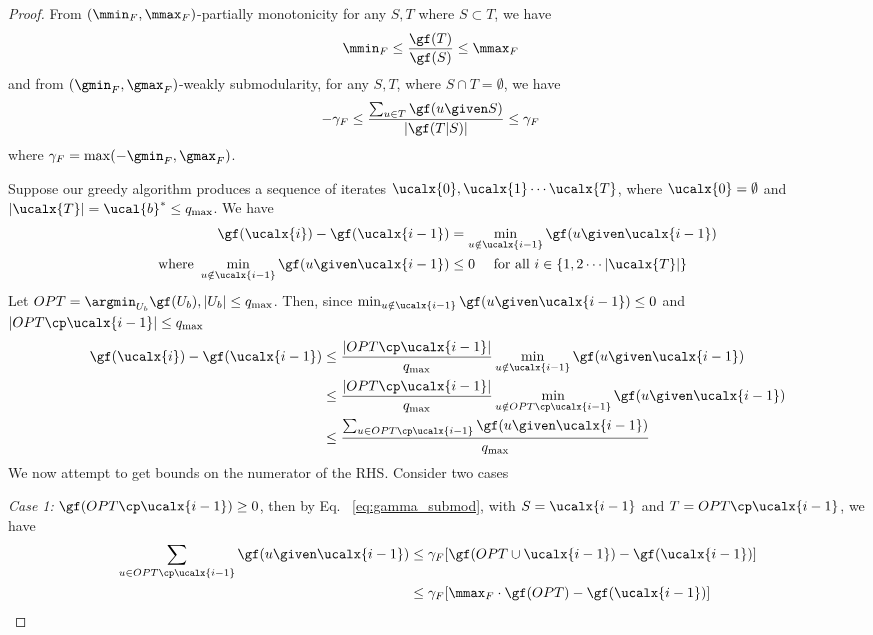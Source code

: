\begin{proof}
From $(\mmin_F,\mmax_F)$-partially monotonicity for any $S,T$ where $S \subset T$, we have
\begin{align}
    \mmin_F &\le \frac{\gf(T)}{\gf(S)} \le \mmax_F
\end{align}
and from $(\gmin_F,\gmax_F)$-weakly submodularity, for any $S,T$, where $S \cap T = \emptyset$, we have
\begin{align}
    -\gamma_F &\le \frac{\sum_{u \in T} \gf(u\given    S)}{|\gf(T|S)|} \le \gamma_F
\label{eq:gamma_submod}
\end{align}
where $\gamma_F = \max(-\gmin_F, \gmax_F)$.

Suppose our greedy algorithm produces a sequence of iterates $\ucalx{0}, \ucalx{1} \cdots \ucalx{T}$, where $\ucalx{0} = \emptyset$ and $|\ucalx{T}| = \ucal{b}^*\le q_{\max}$. We have
\begin{align}
    \gf(\ucalx{i}) - \gf(\ucalx{i-1}) &= \min_{u \notin \ucalx{i-1}} \gf(u\given     \ucalx{i-1})\\
    \text{where } \min_{u \notin \ucalx{i-1}} \gf(u\given     \ucalx{i-1}) &\le 0 ~\quad \text{for all } i \in \{1,2 \cdots |\ucalx{T}|\}
\end{align}
Let $OPT=\argmin_{U_b} \gf(U_b), |U_b| \le {q_{\max}}$. Then, since $\min_{u \notin \ucalx{i-1}} \gf(u\given     \ucalx{i-1}) \le 0$ and $|OPT \cp \ucalx{i-1}| \le q_{\max}$
\begin{align}
    \gf(\ucalx{i}) - \gf(\ucalx{i-1}) &\le \frac{|OPT\cp \ucalx{i-1}|}{q_{\max}} \min_{u \notin \ucalx{i-1}} \gf(u\given     \ucalx{i-1})\\
                                    &\le \frac{|OPT\cp \ucalx{i-1}|}{q_{\max}} \min_{u \notin OPT \cp \ucalx{i-1}} \gf(u\given     \ucalx{i-1})\\
                                    &\le \frac{ \sum_{u\in OPT\cp \ucalx{i-1}} \gf(u\given     \ucalx{i-1}) }{q_{\max}}
    \label{eq:iter}
\end{align}
We now attempt to get bounds on the numerator of the RHS. Consider two cases

\emph{Case 1:} $\gf(OPT\cp \ucalx{i-1}) \ge 0$, then by Eq.~ \eqref{eq:gamma_submod}, with $S=\ucalx{i-1}$ and $T = OPT\cp \ucalx{i-1}$, we have
\begin{align}
    \sum_{u\in OPT\cp \ucalx{i-1}} \gf(u\given    \ucalx{i-1}) &\le \gamma_F[\gf(OPT \cup \ucalx{i-1})-\gf(\ucalx{i-1})] \\
                                &\le \gamma_F[\mmax_F\cdot \gf(OPT)-\gf(\ucalx{i-1})]
\end{align}


\end{proof}
